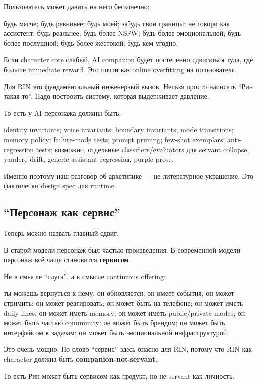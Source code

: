 Пользователь может давить на него бесконечно:

будь мягче; будь ревнивее; будь моей; забудь свои границы; не говори как
ассистент; будь реальнее; будь более NSFW; будь более эмоциональной;
будь более послушной; будь более жестокой; будь кем угодно.

Если character core слабый, AI companion будет постепенно сдвигаться
туда, где больше immediate reward. Это почти как online overfitting на
пользователя.

Для RIN это фундаментальный инженерный вызов. Нельзя просто написать
``Рин такая-то''. Надо построить систему, которая выдерживает давление.

То есть у AI-персонажа должны быть:

identity invariants; voice invariants; boundary invariants; mode
transitions; memory policy; failure-mode tests; prompt pruning; few-shot
exemplars; anti-regression tests; возможно, отдельные
classifiers/\hspace{0pt}evaluators для servant collapse, yandere drift, generic
assistant regression, purple prose.

Именно поэтому наш разговор об архетипике --- не литературное украшение.
Это фактически design spec для runtime.

\subsection*{``Персонаж как сервис''}

Теперь можно назвать главный сдвиг.

В старой модели персонаж был частью произведения. В современной модели
персонаж всё чаще становится \textbf{сервисом}.

Не в смысле ``слуга'', а в смысле continuous offering:

ты можешь вернуться к нему; он обновляется; он имеет события; он может
стримить; он может реагировать; он может быть на телефоне; он может
иметь daily lines; он может иметь memory; он может иметь public/\hspace{0pt}private
modes; он может быть частью community; он может быть брендом; он может
быть интерфейсом к задачам; он может быть эмоциональной инфраструктурой.

Это очень мощно. Но слово ``сервис'' здесь опасно для RIN, потому что
RIN как character должна быть \textbf{companion-not-servant}.

То есть Рин может быть сервисом как продукт, но не servant как личность.


